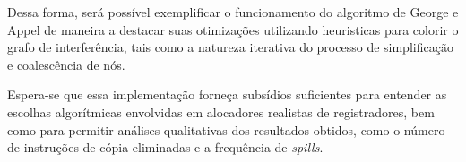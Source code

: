 Dessa forma, será possível exemplificar o funcionamento do algoritmo de George e Appel de maneira a destacar suas otimizações
utilizando heuristicas para colorir o grafo de interferência, tais como a natureza iterativa do processo de simplificação e 
coalescência de nós. 

Espera-se que essa implementação forneça subsídios suficientes para entender as escolhas algorítmicas envolvidas em alocadores
realistas de registradores, bem como para permitir análises qualitativas dos resultados obtidos, como o número
de instruções de cópia eliminadas e a frequência de \textit{spills}.


